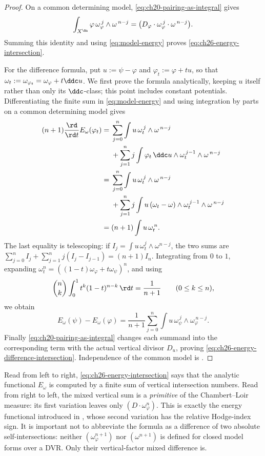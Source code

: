 \begin{proof}
On a common determining model,
\eqref{eq:ch20-pairing-as-integral} gives
\[
 \int_{X^{\An}}\varphi\,
       \omega_\varphi^{\,j}\wedge\omega^{\,n-j}
 =\bigl(D_\varphi\cdot\omega_\varphi^{\,j}
                         \cdot\omega^{\,n-j}\bigr).
\]
Summing this identity and using \eqref{eq:model-energy} proves
\eqref{eq:ch26-energy-intersection}.

For the difference formula, put \(u:=\psi-\varphi\) and
\(\varphi_t:=\varphi+tu\), so that
\(\omega_t:=\omega_{\varphi_t}=\omega_\varphi+t\ddc u\).  We first prove
the formula analytically, keeping \(u\) itself rather than only its
\(\ddc\)-class; this point includes constant potentials.  Differentiating
the finite sum in \eqref{eq:model-energy} and using integration by parts on
a common determining model gives
\[
\begin{aligned}
 (n+1)\frac{\rd}{\rd t}E_\omega(\varphi_t)
 ={}&\sum_{j=0}^n\int u\,\omega_t^{\,j}\wedge\omega^{\,n-j}\\
 &+\sum_{j=1}^n j\int \varphi_t\,\ddc u\wedge
             \omega_t^{\,j-1}\wedge\omega^{\,n-j}\\
 ={}&\sum_{j=0}^n\int u\,\omega_t^{\,j}\wedge\omega^{\,n-j}\\
 &+\sum_{j=1}^n j\int u\,(\omega_t-\omega)\wedge
             \omega_t^{\,j-1}\wedge\omega^{\,n-j}\\
 ={}&(n+1)\int u\,\omega_t^{\,n}.
\end{aligned}
\]
The last equality is telescoping: if
\(I_j=\int u\,\omega_t^j\wedge\omega^{n-j}\), the two sums are
\(\sum_{j=0}^n I_j+\sum_{j=1}^n j(I_j-I_{j-1})=(n+1)I_n\).
Integrating from \(0\) to \(1\), expanding
\(\omega_t^n=((1-t)\omega_\varphi+t\omega_\psi)^n\), and using
\[
 \binom nk\int_0^1t^k(1-t)^{n-k}\,\rd t=\frac1{n+1}
 \qquad(0\leq k\leq n),
\]
we obtain
\[
 E_\omega(\psi)-E_\omega(\varphi)
 =\frac1{n+1}\sum_{j=0}^n
   \int u\,\omega_\psi^{\,j}\wedge\omega_\varphi^{\,n-j}.
\]
Finally \eqref{eq:ch20-pairing-as-integral} changes each summand into the
corresponding term with the actual vertical divisor \(D_u\), proving
\eqref{eq:ch26-energy-difference-intersection}.  Independence of the common
model is .
\end{proof}

\begin{remark}
\label{rem:ch26-energy-intersection-reading}
Read from left to right, \eqref{eq:ch26-energy-intersection} says that the
analytic functional \(E_\omega\) is computed by a finite sum of vertical
intersection numbers.  Read from right to left, the mixed vertical sum is a
\emph{primitive} of the Chambert--Loir measure: its first variation leaves
only \((D\cdot\omega_\varphi^n)\).  This is exactly the energy functional
introduced in , whose second variation has the
relative Hodge-index sign.  It is important not to abbreviate the formula as
a difference of two absolute self-intersections: neither
\((\omega_\varphi^{n+1})\) nor \((\omega^{n+1})\) is defined for closed
model forms over a DVR.  Only their vertical-factor mixed difference is.
\end{remark}


